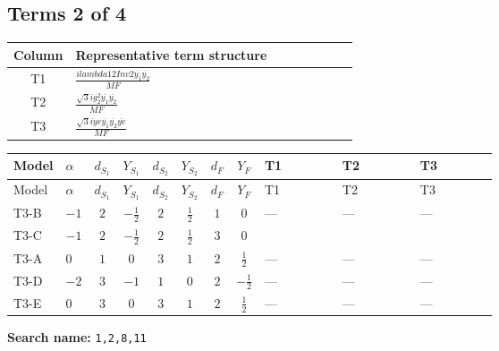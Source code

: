 \documentclass[8pt]{article}
\begin{document}
\begin{landscape}
\subsection*{Terms 2 of 4}
\begin{center}
\begin{tabular}{@{}c >{\raggedright\arraybackslash}p{0.82\linewidth}@{}}
\toprule
Column & Representative term structure \\
\midrule
T1 & \(\displaystyle \frac{i lambda12Inv2 \overline{y_{1}} \overline{y_{2}}}{MF}\) \\
\midrule
T2 & \(\displaystyle \frac{\sqrt{3} i g_{2}^{2} \overline{y_{1}} \overline{y_{2}}}{MF}\) \\
\midrule
T3 & \(\displaystyle \frac{\sqrt{3} i ye \overline{y_{1}} \overline{y_{2}} \overline{ye}}{MF}\) \\
\midrule
\bottomrule
\end{tabular}
\end{center}
\smallskip
\tiny
\begin{longtable}{@{}llcccccc >{\raggedright\arraybackslash}p{0.21\linewidth} >{\raggedright\arraybackslash}p{0.21\linewidth} >{\raggedright\arraybackslash}p{0.21\linewidth}@{}}
\toprule
Model & $\alpha$ & $d_{S_1}$ & $Y_{S_1}$ & $d_{S_2}$ & $Y_{S_2}$ & $d_F$ & $Y_F$ & T1 & T2 & T3 \\
\midrule
\endfirsthead
\toprule
Model & $\alpha$ & $d_{S_1}$ & $Y_{S_1}$ & $d_{S_2}$ & $Y_{S_2}$ & $d_F$ & $Y_F$ & T1 & T2 & T3 \\
\midrule
\endhead
T3-B & $-1$ & $2$ & $-\frac{1}{2}$ & $2$ & $\frac{1}{2}$ & $1$ & $0$ & --- & --- & --- \\
\midrule
T3-C & $-1$ & $2$ & $-\frac{1}{2}$ & $2$ & $\frac{1}{2}$ & $3$ & $0$ & \scriptsize\adjustbox{max width=\linewidth}{$\begin{gathered} - \frac{i lambda12Inv2 \overline{y_{1}} \overline{y_{2}}}{6 MF}\end{gathered}$} & \scriptsize\adjustbox{max width=\linewidth}{$\begin{gathered} - \frac{\sqrt{3} i g_{2}^{2} \overline{y_{1}} \overline{y_{2}}}{8 MF}\end{gathered}$} & \scriptsize\adjustbox{max width=\linewidth}{$\begin{gathered} \frac{\sqrt{3} i ye \overline{y_{1}} \overline{y_{2}} \overline{ye}}{24 MF}\end{gathered}$} \\
\midrule
T3-A & $0$ & $1$ & $0$ & $3$ & $1$ & $2$ & $\frac{1}{2}$ & --- & --- & --- \\
\midrule
T3-D & $-2$ & $3$ & $-1$ & $1$ & $0$ & $2$ & $-\frac{1}{2}$ & --- & --- & --- \\
\midrule
T3-E & $0$ & $3$ & $0$ & $3$ & $1$ & $2$ & $\frac{1}{2}$ & --- & --- & --- \\
\midrule
\bottomrule
\end{longtable}
\clearpage
\noindent\textbf{Search name: }\texttt{1,2,8,11}\par\smallskip

\end{landscape}
\end{document}
